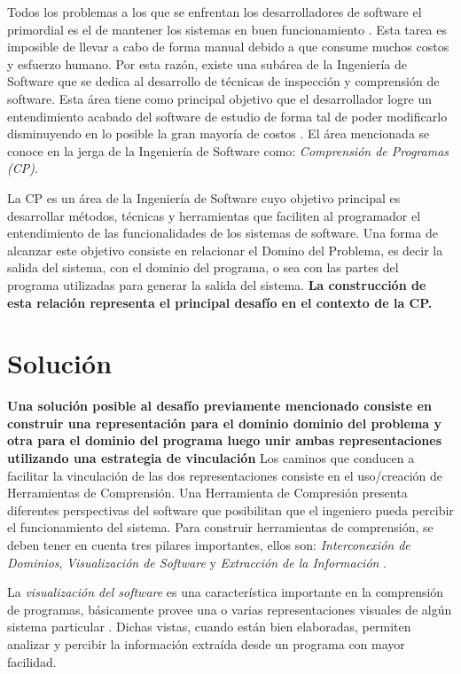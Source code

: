 \documentclass[12pt]{report}
\begin{document}
Todos los problemas a los que se enfrentan los desarrolladores de software el primordial es el de mantener los sistemas en buen funcionamiento \cite{VMAVA95}. 
Esta tarea es imposible de llevar a cabo de forma manual debido a que consume 
muchos costos y esfuerzo humano. 
Por esta razón, existe una subárea de la Ingeniería de Software que se  
dedica al desarrollo de técnicas de inspección y comprensión de software. 
Esta área tiene como principal objetivo que el desarrollador logre un entendimiento 
acabado del software de estudio de forma tal de poder modificarlo disminuyendo en lo posible la gran mayoría de costos \cite{BRM10}. 
El área mencionada se conoce en la jerga de la Ingeniería de Software como: 
\textit{Comprensión de Programas (CP)}.


La CP es un área de la Ingeniería de Software cuyo objetivo 
principal es desarrollar métodos, técnicas y herramientas que faciliten al programador 
el entendimiento de las funcionalidades de los sistemas de software.
Una forma de alcanzar este objetivo consiste en relacionar el Domino del Problema, 
es decir la salida del sistema, con el dominio del programa, o sea 
con las partes del programa utilizadas para generar la salida del sistema.
\textbf{La construcción de esta relación representa el principal desafío en el contexto de la CP.}



\section{Solución}

\textbf{Una solución posible al desafío previamente mencionado consiste en construir una representación para el dominio dominio del problema y otra para el dominio del programa luego unir ambas representaciones utilizando una estrategia de vinculación} 
Los caminos que conducen a facilitar la vinculación de las dos representaciones consiste en el uso/creación de Herramientas de Comprensión. 
Una Herramienta de Compresión presenta diferentes perspectivas del software que posibilitan que el ingeniero pueda percibir el funcionamiento del sistema. 
Para construir herramientas de comprensión, se deben tener en cuenta tres pilares importantes, ellos son: \textit{Interconexión de Dominios}, 
\textit{Visualización de Software} y 
\textit{Extracción de la Información} \cite{STOREY99,BROOK82}.

La \textit{visualización del software} es una característica importante en la comprensión de programas, básicamente provee una o varias representaciones visuales de algún sistema particular \cite{BRM10}.
Dichas vistas, cuando están bien elaboradas, permiten analizar y percibir la información extraída desde un programa con mayor facilidad.
\end{document}
